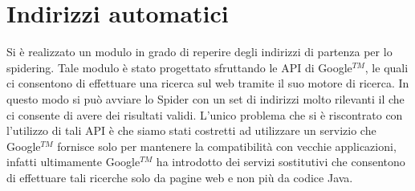 \section{Indirizzi automatici}\label{cap:spider:roots}
Si è realizzato un modulo in grado di reperire degli indirizzi di partenza per lo spidering. Tale modulo è stato progettato sfruttando le API di Google$^{TM}$, le quali ci consentono di effettuare una ricerca sul web tramite il suo motore di ricerca. In questo modo si può avviare lo Spider con un set di indirizzi molto rilevanti il che ci consente di avere dei risultati validi. L'unico problema che si è riscontrato con l'utilizzo di tali API è che siamo stati costretti ad utilizzare un servizio che Google$^{TM}$ fornisce solo per mantenere la compatibilità con vecchie applicazioni, infatti ultimamente Google$^{TM}$ ha introdotto dei servizi sostitutivi che consentono di effettuare tali ricerche solo da pagine web e non più da codice Java.